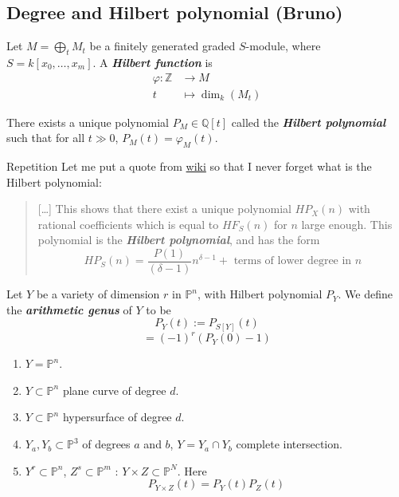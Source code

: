 \subsection{Degree and Hilbert polynomial (Bruno)}


\begin{defn}
	Let $M=\bigoplus_{t}M_t$ be a finitely generated graded $S$-module, where $S=k[x_0,\ldots,x_m]$. A \textit{\textbf{Hilbert function}} is
	\begin{align*}
		\varphi: \mathbb{Z} &\longrightarrow M \\
		t &\longmapsto \dim_k(M_t)
	\end{align*}
\end{defn}

\begin{thm}[Definition]
	There exists a unique polynomial $P_M\in\mathbb{Q}[t]$ called the \textit{\textbf{Hilbert polynomial}} such that for all $t\gg 0$, $P_M(t)=\varphi_M(t)$.
\end{thm}

\begin{thing5}{Repetition}\leavevmode
	Let me put a quote from \href{https://en.wikipedia.org/wiki/Hilbert_series_and_Hilbert_polynomial#Definitions_and_main_properties}{wiki} so that I never forget what is the Hilbert polynomial:
	{\color{6}\begin{quotation}
			[…] This shows that there exist a unique polynomial $HP_X(n)$ with rational coefficients which is equal to $HF_S(n)$ for $n$ large enough. This polynomial is the \textit{\textbf{Hilbert polynomial}}, and has the form
			\[HP_S(n)=\frac{P(1)}{(\delta-1)}n^{\delta-1}+\text{ terms of lower degree in } n\]
	\end{quotation}}
\end{thing5}

\begin{manualexercise}{7.2}
	Let $Y$ be a variety of dimension $r$ in $\mathbb{P}^n$, with Hilbert polynomial $P_Y$. We define the \textit{\textbf{arithmetic genus}} of $Y$ to be
	\[P_Y(t):=P_{S[Y]}(t)\]
	\[=(-1)^r(P_Y(0)-1)\]
	\begin{enumerate}[label=\alph*.]
		\item  $Y=\mathbb{P}^n$.
		\item $Y\subset \mathbb{P}^n$ plane curve of degree $d$.
		\item $ Y\subset \mathbb{P}^n$ hypersurface of degree $d$.
		\item $Y_a,Y_b\subset \mathbb{P}^3$ of degrees $a$ and $b$, $Y =Y_a\cap Y_b$ complete intersection.
		\item $Y^r\subset \mathbb{P}^n$, $Z^s\subset \mathbb{P}^m$ : $Y\times Z\subset \mathbb{P}^N$. Here
			\[P_{Y\times Z}(t)=P_Y(t)P_Z(t)\]
	\end{enumerate}
\end{manualexercise}

